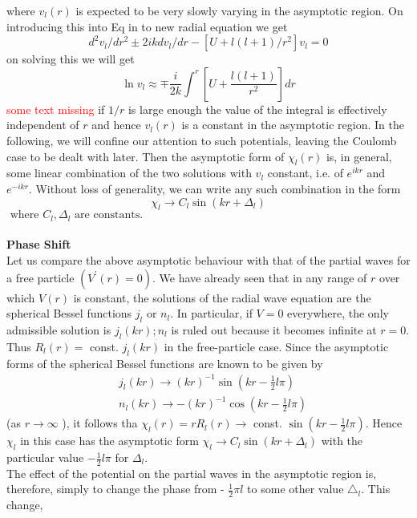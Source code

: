 where $v_{l}(r)$ is expected to be very slowly varying in the asymptotic region. On introducing this into Eq in to new radial equation we get
$$
d^{2} v_{l} / d r^{2} \pm 2 i k d v_{l} / d r-\left[U+l(l+1) / r^{2}\right] v_{l}=0
$$
on solving this we will get\\
$$\ln v_{l} \approx \mp \frac{i}{2 k} \int^{r}\left[U+\frac{l(l+1)}{r^{2}}\right] d r$$
\textcolor{red}{some text missing} if $1/r$ is large enough the value of the integral is effectively independent of $r$ and hence $v_{l}(r)$ is a constant in the asymptotic region. In the following, we will confine our attention to such potentials, leaving the Coulomb case to be dealt with later. Then the asymptotic form of $\chi_{l}(r)$ is, in general, some linear combination of the two solutions with $v_{l}$ constant, i.e. of $e^{i k r}$ and $e^{-ikr}$. Without loss of generality, we can write any such combination in the form\\
$${\chi}_{l} \rightarrow C_{l} \sin \left(k r+\Delta_{l}\right)$$
$\text { where } C_{l}, \Delta_{l} \text { are constants. }$\\\\
\textbf{Phase Shift}\\
 Let us compare the above asymptotic behaviour with that of the partial waves for a free particle $\left(V^{\prime}(r)=0\right)$. We have already seen  that in any range of $r$ over which $V(r)$ is constant, the solutions of the radial wave equation are the spherical Bessel functions $j_{l}$ or $n_{l}$. In particular, if $V=0$ everywhere, the only admissible solution is $j_{l}(k r) ; n_{l}$ is ruled out because it becomes infinite at $r=0$. Thus $R_{l}(r)=$ const. $j_{l}(k r)$ in the free-particle case. Since the asymptotic forms of the spherical Bessel functions are known to be given by
 $$\begin{aligned}
 	&j_{l}(k r) \rightarrow(k r)^{-1} \sin \left(k r-\frac{1}{2} l \pi\right) \\
 	&n_{l}(k r) \rightarrow-(k r)^{-1} \cos \left(k r-\frac{1}{2} l \pi\right)
 \end{aligned}$$
 (as $r \rightarrow \infty$ ), it follows tha $\chi_{l}(r)=r R_{l}(r) \rightarrow$ const. $\sin \left(k r-\frac{1}{2} l \pi\right)$. Hence $\chi_{l}$ in this case has the asymptotic form ${\chi}_{l} \rightarrow C_{l} \sin \left(k r+\Delta_{l}\right)$ with the particular value $-\frac{1}{2} l \pi$ for $\Delta_{l}$.\\
 The effect of the potential on the partial waves in the asymptotic region is, therefore, simply to change the phase from - $\frac{1}{2} \pi l$ to some other value $\triangle_{l}$. This change,
